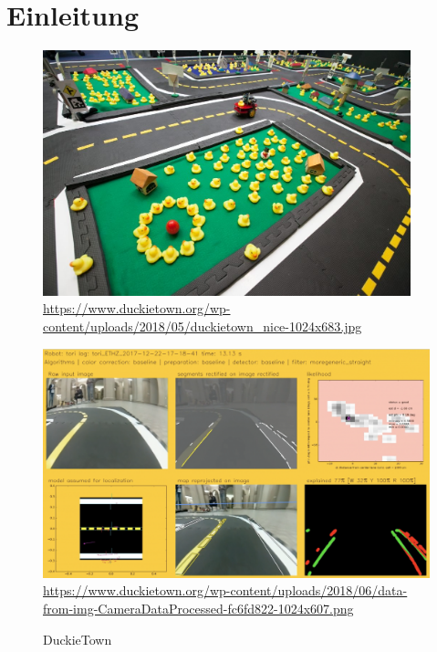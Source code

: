 \chapter{Einleitung}

\begin{figure}[H]
	\centering
	\begin{minipage}{.5\textwidth}
		\centering
		\includegraphics[width=0.95\textwidth]{kapitel1/images/duckietown.png}
		\quelle\url{https://www.duckietown.org/wp-content/uploads/2018/05/duckietown_nice-1024x683.jpg}
		\label{fig:duckietown}
	\end{minipage}%
	\begin{minipage}{.5\textwidth}
		\centering
		\includegraphics[width=1.072\textwidth]{kapitel1/images/duckietown2.png}
		\quelle\url{https://www.duckietown.org/wp-content/uploads/2018/06/data-from-img-CameraDataProcessed-fc6fd822-1024x607.png}
		\label{fig:duckietown2}
	\end{minipage}
	\caption{DuckieTown}
\end{figure}

